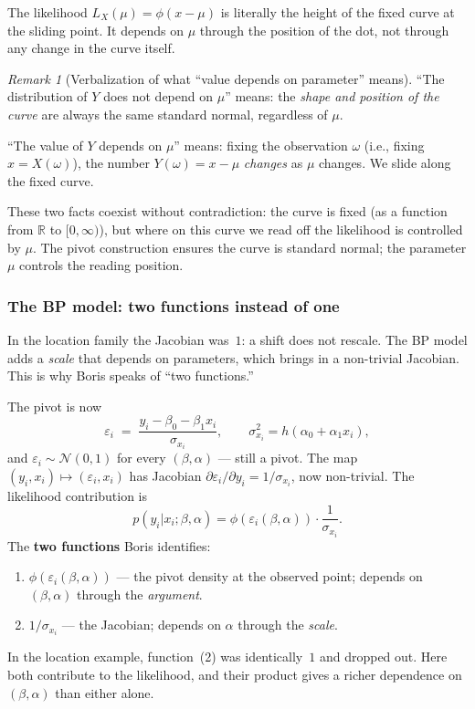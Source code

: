\documentclass[a4paper,oneside,12pt]{extarticle}
\theoremstyle{plain}
\theoremstyle{definition}
\theoremstyle{remark}
\newtheorem{remark}[proposition]{Remark}
\begin{document}
The likelihood $L_X(\mu) = \phi(x - \mu)$ is literally the height of
the fixed curve at the sliding point.  It depends on $\mu$ through
the position of the dot, not through any change in the curve itself.

\begin{remark}[Verbalization of what ``value depends on parameter'' means]
``The distribution of $Y$ does not depend on $\mu$'' means: the
\emph{shape and position of the curve} are always the same standard
normal, regardless of $\mu$.

``The value of $Y$ depends on $\mu$'' means: fixing the observation
$\omega$ (i.e., fixing $x = X(\omega)$), the number $Y(\omega) =
x - \mu$ \emph{changes} as $\mu$ changes.  We slide along the fixed
curve.

These two facts coexist without contradiction: the curve is fixed
(as a function from $\mathbb{R}$ to $[0,\infty)$), but where on
this curve we read off the likelihood is controlled by $\mu$.
The pivot construction ensures the curve is standard normal;
the parameter $\mu$ controls the reading position.
\end{remark}

\subsubsection*{The BP model: two functions instead of one}

In the location family the Jacobian was~$1$: a shift does not
rescale.  The BP model adds a \emph{scale} that depends on parameters,
which brings in a non-trivial Jacobian.  This is why Boris speaks of
``two functions.''

The pivot is now
\[
  \varepsilon_i
  \;=\;
  \frac{y_i - \beta_0 - \beta_1 x_i}{\sigma_{x_i}},
  \qquad
  \sigma_{x_i}^2 = h(\alpha_0 + \alpha_1 x_i),
\]
and $\varepsilon_i \sim \mathcal{N}(0,1)$ for every $(\beta,\alpha)$
— still a pivot.  The map $(y_i, x_i) \mapsto (\varepsilon_i, x_i)$
has Jacobian $\partial\varepsilon_i/\partial y_i = 1/\sigma_{x_i}$,
now non-trivial.  The likelihood contribution is
\[
  p(y_i|x_i;\beta,\alpha)
  = \phi(\varepsilon_i(\beta,\alpha)) \cdot \frac{1}{\sigma_{x_i}}.
\]
The \textbf{two functions} Boris identifies:
\begin{enumerate}
\item $\phi(\varepsilon_i(\beta,\alpha))$ — the pivot density at the
  observed point; depends on $(\beta,\alpha)$ through the \emph{argument}.
\item $1/\sigma_{x_i}$ — the Jacobian; depends on $\alpha$ through the
  \emph{scale}.
\end{enumerate}
In the location example, function~(2) was identically~$1$ and dropped
out.  Here both contribute to the likelihood, and their product gives
a richer dependence on $(\beta,\alpha)$ than either alone.
\end{document}
